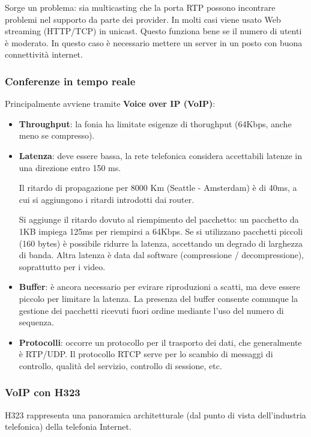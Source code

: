             Sorge un problema: sia multicasting che la porta RTP possono incontrare problemi nel supporto da parte dei provider. In molti casi viene usato Web streaming (HTTP/TCP) in unicast. Questo funziona bene se il numero di utenti è moderato. In questo caso è necessario mettere un server in un posto con buona connettività internet.

        \subsubsection{Conferenze in tempo reale}
            Principalmente avviene tramite \textbf{Voice over IP (VoIP)}:
            \begin{itemize}
                \item \textbf{Throughput}: la fonia ha limitate esigenze di thorughput (64Kbps, anche meno se compresso).
                
                \item \textbf{Latenza}: deve essere bassa, la rete telefonica considera accettabili latenze in una direzione entro 150 ms.
                
                Il ritardo di propagazione per 8000 Km (Seattle - Amsterdam) è di 40ms, a cui si aggiungono i ritardi introdotti dai router.
                
                Si aggiunge il ritardo dovuto al riempimento del pacchetto: un pacchetto da 1KB impiega 125ms per riempirsi a 64Kbps. Se si utilizzano pacchetti piccoli (160 bytes) è possibile ridurre la latenza, accettando un degrado di larghezza di banda.
                Altra latenza è data dal software (compressione / decompressione), soprattutto per i video.
                
                \item \textbf{Buffer}: è ancora necessario per evirare riproduzioni a scatti, ma deve essere piccolo per limitare la latenza. La presenza del buffer consente comunque la gestione dei pacchetti ricevuti fuori ordine mediante l'uso del numero di sequenza.
                
                \item \textbf{Protocolli}: occorre un protocollo per il trasporto dei dati, che generalmente è RTP/UDP. Il protocollo RTCP serve per lo scambio di messaggi di controllo, qualità del servizio, controllo di sessione, etc.
            \end{itemize}

        \subsubsection{VoIP con H323}
            H323 rappresenta una panoramica architetturale (dal punto di vista dell'industria telefonica) della telefonia Internet.
        
